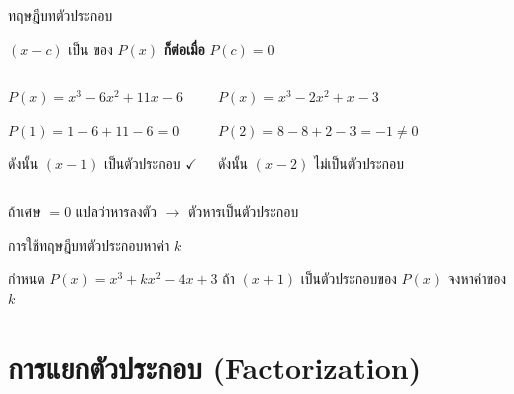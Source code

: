 \documentclass[11pt, aspectratio=169]{beamer}
\begin{document}
\begin{frame}{ทฤษฎีบทตัวประกอบ}
  \begin{explanation}[ทฤษฎีบท]
    $(x - c)$ เป็น  ของ $P(x)$ \textbf{ก็ต่อเมื่อ} $P(c) = 0$
  \end{explanation}

  \begin{columns}[T]
      \begin{exambox}
        $P(x) = x^3 - 6x^2 + 11x - 6$

        $P(1) = 1 - 6 + 11 - 6 = 0$

        ดังนั้น $(x-1)$ เป็นตัวประกอบ $\checkmark$
      \end{exambox}
      \begin{exambox}
        $P(x) = x^3 - 2x^2 + x - 3$

        $P(2) = 8 - 8 + 2 - 3 = -1 \neq 0$

        ดังนั้น $(x-2)$ ไม่เป็นตัวประกอบ
      \end{exambox}
  \end{columns}

  \begin{intuition}
    ถ้าเศษ $= 0$ แปลว่าหารลงตัว $\rightarrow$ ตัวหารเป็นตัวประกอบ
  \end{intuition}
\end{frame}\begin{frame}[t]{การใช้ทฤษฎีบทตัวประกอบหาค่า $k$}
  \begin{exambox}[โจทย์]
    กำหนด $P(x) = x^3 + kx^2 - 4x + 3$ ถ้า $(x+1)$ เป็นตัวประกอบของ $P(x)$
    จงหาค่าของ $k$
  \end{exambox}
  \vspace{\fill}


\end{frame}

\section{การแยกตัวประกอบ (Factorization)}
\end{document}
